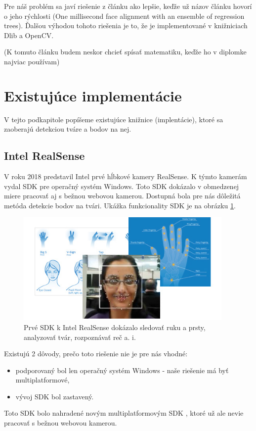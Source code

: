 Pre náš problém sa javí riešenie z článku \cite{kazemi2014one} ako lepšie, keďže už názov článku hovorí o jeho rýchlosti (One millisecond face alignment with an ensemble of regression trees). 
Ďalšou výhodou tohoto riešenia je to, že je implementované v knižniciach Dlib a OpenCV.

(K tomuto článku budem neskor chcieť spísať matematiku, keďže ho v diplomke najviac používam)

\section{Existujúce implementácie}
V tejto podkapitole popíšeme existujúce knižnice (implentácie), ktoré sa zaoberajú detekciou tváre a bodov na nej.

\subsection{Intel RealSense}
V roku 2018 predstavil Intel prvé hĺbkové kamery RealSense.
K týmto kamerám vydal SDK \cite{realsensedis} pre operačný systém Windows. 
Toto SDK dokázalo v obmedzenej miere pracovať aj s bežnou webovou kamerou. 
Dostupná bola pre nás dôležitá metóda detekcie bodov na tvári. 
Ukážka funkcionality SDK je na obrázku \ref{pic-realsensedis}.

\begin{figure}[H]
	\begin{center}
		\includegraphics[height=5.5cm]{pics/realsensedis.jpg}
		\caption{Prvé SDK k Intel RealSense dokázalo sledovať ruku a prsty, analyzovať tvár, rozpoznávať reč a. i.
		 \cite{realsensedis}}
		\label{pic-realsensedis}
	\end{center}
\end{figure}

Existujú 2 dôvody, prečo toto riešenie nie je pre nás vhodné: 
\begin{itemize}
	\item podporovaný bol len operačný systém Windows - naše riešenie má byť multiplatformové,
	\item vývoj SDK bol zastavený.
\end{itemize}
Toto SDK bolo nahradené novým multiplatformovým SDK \cite{realsensenew}, ktoré už ale nevie pracovať s bežnou webovou kamerou. 

